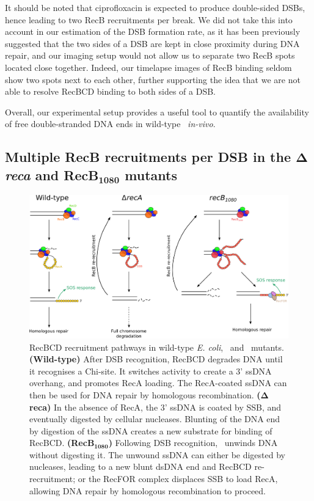 It should be noted that ciprofloxacin is expected to produce double-sided DSBs, hence leading to two RecB recruitments per break. We did not take this into account in our estimation of the DSB formation rate, as it has been previously suggested that the two sides of a DSB are kept in close proximity during DNA repair\cite{Vickridge2017,Keyamura2019}, and our imaging setup would not allow us to separate two RecB spots located close together. Indeed, our timelapse images of RecB binding seldom show two spots next to each other, further supporting the idea that we are not able to resolve RecBCD binding to both sides of a DSB.

Overall, our experimental setup provides a useful tool to quantify the availability of free double-stranded DNA ends in wild-type \ecoli\ \emph{in-vivo}.

\subsection*{Multiple RecB recruitments per DSB in the $\mathbf{\Delta}$\emph{reca} and RecB$\mathbf{_{1080}}$ mutants}

\begin{figure}[htbp]
    \centering
    \includegraphics[width=\textwidth]{Figures/Fig_mutants_pathways.pdf}
    \caption{RecBCD recruitment pathways in wild-type \emph{E. coli}, \dreca\ and \geneteneighty\ mutants. \textbf{(Wild-type)} After DSB recognition, RecBCD degrades DNA until it recognises a Chi-site. It switches activity to create a 3' ssDNA overhang, and promotes RecA loading. The RecA-coated ssDNA can then be used for DNA repair by homologous recombination. \textbf{($\mathbf{\Delta}$reca)} In the absence of RecA, the 3' ssDNA is coated by SSB, and eventually digested by cellular nucleases. Blunting of the DNA end by digestion of the ssDNA creates a new substrate for binding of RecBCD. \textbf{(RecB$\mathbf{_{1080}}$)} Following DSB recognition, \teneighty\ unwinds DNA without digesting it. The unwound ssDNA can either be digested by nucleases, leading to a new blunt dsDNA end and RecBCD re-recruitment; or the RecFOR complex displaces SSB to load RecA, allowing DNA repair by homologous recombination to proceed.}
    \label{Fig:pathways}
\end{figure}

